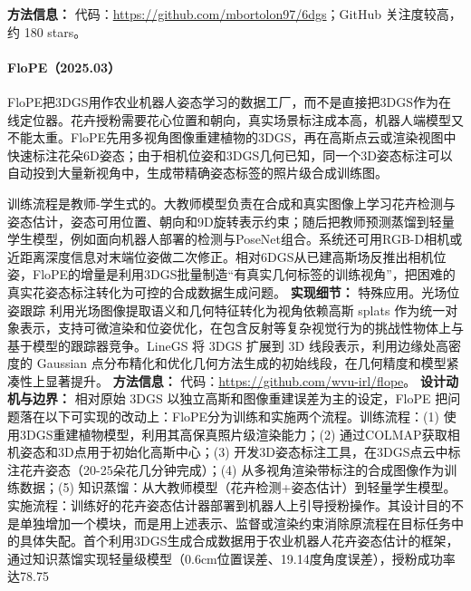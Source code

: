 \textbf{方法信息：} 代码：\url{https://github.com/mbortolon97/6dgs}；GitHub 关注度较高，约 180 stars。



\paragraph{FloPE（2025.03）\cite{2503_11692}}
FloPE把3DGS用作农业机器人姿态学习的数据工厂，而不是直接把3DGS作为在线定位器。花卉授粉需要花心位置和朝向，真实场景标注成本高，机器人端模型又不能太重。FloPE先用多视角图像重建植物的3DGS，再在高斯点云或渲染视图中快速标注花朵6D姿态；由于相机位姿和3DGS几何已知，同一个3D姿态标注可以自动投到大量新视角中，生成带精确姿态标签的照片级合成训练图。

训练流程是教师-学生式的。大教师模型负责在合成和真实图像上学习花卉检测与姿态估计，姿态可用位置、朝向和9D旋转表示约束；随后把教师预测蒸馏到轻量学生模型，例如面向机器人部署的检测与PoseNet组合。系统还可用RGB-D相机或近距离深度信息对末端位姿做二次修正。相对6DGS从已建高斯场反推出相机位姿，FloPE的增量是利用3DGS批量制造“有真实几何标签的训练视角”，把困难的真实花姿态标注转化为可控的合成数据生成问题。
\textbf{实现细节：} 特殊应用。光场位姿跟踪 利用光场图像提取语义和几何特征转化为视角依赖高斯 splats 作为统一对象表示，支持可微渲染和位姿优化，在包含反射等复杂视觉行为的挑战性物体上与基于模型的跟踪器竞争。LineGS 将 3DGS 扩展到 3D 线段表示，利用边缘处高密度的 Gaussian 点分布精化和优化几何方法生成的初始线段，在几何精度和模型紧凑性上显著提升。
\textbf{方法信息：} 代码：\url{https://github.com/wvu-irl/flope}。
\textbf{设计动机与边界：} 相对原始 3DGS 以独立高斯和图像重建误差为主的设定，FloPE 把问题落在以下可实现的改动上：FloPE分为训练和实施两个流程。训练流程：(1) 使用3DGS重建植物模型，利用其高保真照片级渲染能力；(2) 通过COLMAP获取相机姿态和3D点用于初始化高斯中心；(3) 开发3D姿态标注工具，在3DGS点云中标注花卉姿态（20-25朵花几分钟完成）；(4) 从多视角渲染带标注的合成图像作为训练数据；(5) 知识蒸馏：从大教师模型（花卉检测+姿态估计）到轻量学生模型。实施流程：训练好的花卉姿态估计器部署到机器人上引导授粉操作。其设计目的不是单独增加一个模块，而是用上述表示、监督或渲染约束消除原流程在目标任务中的具体失配。首个利用3DGS生成合成数据用于农业机器人花卉姿态估计的框架，通过知识蒸馏实现轻量级模型（0.6cm位置误差、19.14度角度误差），授粉成功率达78.75%
